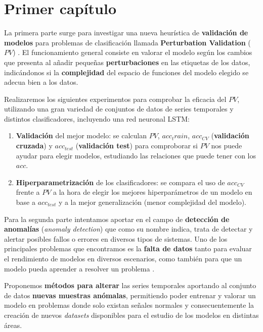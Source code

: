 
\chapter{Primer capítulo}\label{ch:primer-capitulo}

La primera parte surge para investigar una nueva heurística de \textbf{validación de modelos} para problemas de clasificación llamada \textbf{Perturbation Validation} ($PV$) \cite{zhang2019perturbation}. El funcionamiento general consiste en valorar el modelo según los cambios que presenta al añadir pequeñas \textbf{perturbaciones} en las etiquetas de los datos, indicándonos si la \textbf{complejidad} del espacio de funciones del modelo elegido se adecua bien a los datos.

Realizaremos los siguientes experimentos para comprobar la eficacia del $PV$, utilizando una gran variedad de conjuntos de datos de series temporales y distintos clasificadores, incluyendo una red neuronal LSTM:

\begin{enumerate}
  \item \textbf{Validación} del mejor modelo: se calculan $PV$, $acc_train$, $acc_{CV}$ (\textbf{validación cruzada}) y $acc_{test}$ (\textbf{validación test}) para comproborar si $PV$ nos puede ayudar para elegir modelos, estudiando las relaciones que puede tener con los $acc$.
  \item \textbf{Hiperparametrización} de los clasificadores: se compara el uso de $acc_{CV}$ frente a $PV$ a la hora de elegir los mejores hiperparámetros de un modelo en base a $acc_{test}$ y a la mejor generalización (menor complejidad del modelo).
\end{enumerate}

Para la segunda parte intentamos aportar en el campo de \textbf{detección de anomalías} (\emph{anomaly detection}) que como su nombre indica, trata de detectar y alertar posibles fallos o errores en diversos tipos de sistemas. Uno de los principales problemas que encontramos es la \textbf{falta de datos} tanto para evaluar el rendimiento de modelos en diversos escenarios, como también para que un modelo pueda aprender a resolver un problema \cite{ahmed2016survey}.

Proponemos \textbf{métodos para alterar} las series temporales aportando al conjunto de datos \textbf{nuevas muestras anómalas}, permitiendo poder entrenar y valorar un modelo en problemas donde solo existan señales normales y consecuentemente la creación de nuevos \emph{datasets} disponibles para el estudio de los modelos en distintas áreas.

